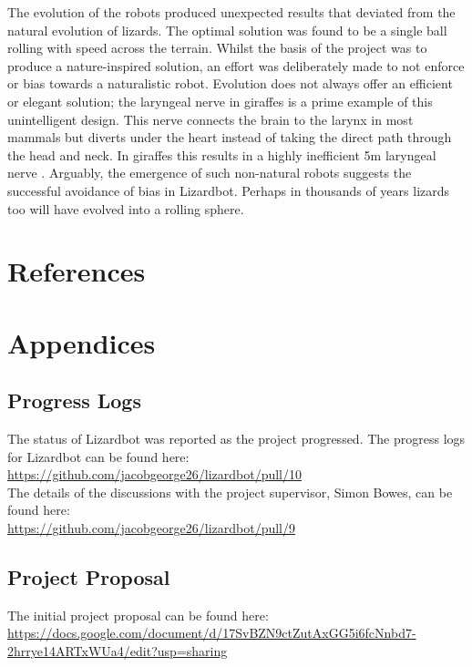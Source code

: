 \documentclass{article}
\begin{document}
The evolution of the robots produced unexpected results that deviated from the natural evolution of lizards. The optimal solution was found to be a single ball rolling with speed across the terrain. Whilst the basis of the project was to produce a nature-inspired solution, an effort was deliberately made to not enforce or bias towards a naturalistic robot. Evolution does not always offer an efficient or elegant solution; the laryngeal nerve in giraffes is a prime example of this unintelligent design. This nerve connects the brain to the larynx in most mammals but diverts under the heart instead of taking the direct path through the head and neck. In giraffes this results in a highly inefficient 5m laryngeal nerve . Arguably, the emergence of such non-natural robots suggests the successful avoidance of bias in Lizardbot. Perhaps in thousands of years lizards too will have evolved into a rolling sphere. 

\newpage

\section{References}
\label{sec:References}

\newpage


\section{Appendices}
\subsection{Progress Logs}
The status of Lizardbot was reported as the project progressed.
The progress logs for Lizardbot can be found here:\\
\url{https://github.com/jacobgeorge26/lizardbot/pull/10}\\

\noindent The details of the discussions with the project supervisor, Simon Bowes, can be found here:\\
\url{https://github.com/jacobgeorge26/lizardbot/pull/9}


\subsection{Project Proposal}
The initial project proposal can be found here:\\
\url{https://docs.google.com/document/d/17SvBZN9ctZutAxGG5i6fcNnbd7-2hrrye14ARTxWUa4/edit?usp=sharing}
\end{document}

